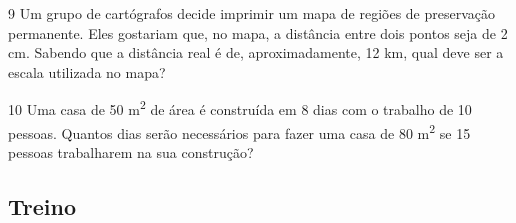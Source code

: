 \begin{escolha}
\begin{boxmedio}
\begin{boxmedio}
{\begin{boxpeq}
\begin{boxpeq}
{\begin{boxpeq}
\begin{boxmedio}
\begin{boxmedio}
\begin{boxpeq}
\begin{boxmedio}
\begin{boxpeq}
\begin{boxpeq}
\begin{boxpeq}
\begin{boxpeq}
\begin{boxmedio}
{\begin{boxmedio}
\begin{boxmedio}
\begin{boxpeq}
\begin{boxmedio}
\begin{boxpeq}
\begin{boxpeq}
\begin{boxpeq}
\begin{escolha}
{\begin{boxmedio}
\begin{boxpeq}
\begin{boxpeq}
\begin{boxpeq}
\begin{boxpeq}
\begin{boxpeq}
\begin{boxmedio}
\begin{boxpeq}
\begin{boxpeq}
\begin{boxpeq}
{\begin{boxpeq}
\begin{boxmedio}
\begin{boxpeq}
\begin{boxpeq}
\begin{boxpeq}
{\begin{boxpeq}
\num{9} Um grupo de cartógrafos decide imprimir um mapa de regiões de
preservação permanente. Eles gostariam que, no mapa, a distância entre
dois pontos seja de 2 cm. Sabendo que a distância real é de,
aproximadamente, 12 km, qual deve ser a escala utilizada no mapa?


\num{10} Uma casa de 50 m\textsuperscript{2} de área é construída em 8 dias 
com o trabalho de 10 pessoas. Quantos dias serão necessários para fazer uma 
casa de 80 m\textsuperscript{2} se 15 pessoas trabalharem na sua construção?

\begin{boxmedio}


\section{Treino}


\end{boxmedio}
\end{boxpeq}}
\end{boxpeq}
\end{boxpeq}
\end{boxpeq}
\end{boxmedio}
\end{boxpeq}}
\end{boxpeq}
\end{boxpeq}
\end{boxpeq}
\end{boxmedio}
\end{boxpeq}
\end{boxpeq}
\end{boxpeq}
\end{boxpeq}
\end{boxpeq}
\end{boxmedio}}
\end{escolha}
\end{boxpeq}
\end{boxpeq}
\end{boxpeq}
\end{boxmedio}
\end{boxpeq}
\end{boxmedio}
\end{boxmedio}}
\end{boxmedio}
\end{boxpeq}
\end{boxpeq}
\end{boxpeq}
\end{boxpeq}
\end{boxmedio}
\end{boxpeq}
\end{boxmedio}
\end{boxmedio}
\end{boxpeq}}
\end{boxpeq}
\end{boxpeq}}
\end{boxmedio}
\end{boxmedio}
\end{escolha}

